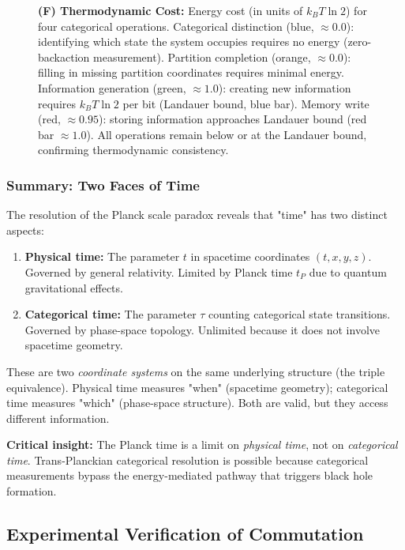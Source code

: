 \documentclass[twocolumn,10pt]{article}
\theoremstyle{remark}
\begin{document}
\begin{figure}[!htbp]
{\textbf{(F) Thermodynamic Cost:} Energy cost (in units of $k_B T \ln 2$) for four categorical operations. Categorical distinction (blue, $\approx 0.0$): identifying which state the system occupies requires no energy (zero-backaction measurement). Partition completion (orange, $\approx 0.0$): filling in missing partition coordinates requires minimal energy. Information generation (green, $\approx 1.0$): creating new information requires $k_B T \ln 2$ per bit (Landauer bound, blue bar). Memory write (red, $\approx 0.95$): storing information approaches Landauer bound (red bar $\approx 1.0$). All operations remain below or at the Landauer bound, confirming thermodynamic consistency.}
\label{fig:information_catalysis}
\end{figure}

\subsubsection{Summary: Two Faces of Time}

The resolution of the Planck scale paradox reveals that "time" has two distinct aspects:

\begin{enumerate}
    \item \textbf{Physical time:} The parameter $t$ in spacetime coordinates $(t, x, y, z)$. Governed by general relativity. Limited by Planck time $t_P$ due to quantum gravitational effects.
    
    \item \textbf{Categorical time:} The parameter $\tau$ counting categorical state transitions. Governed by phase-space topology. Unlimited because it does not involve spacetime geometry.
\end{enumerate}

These are two \textit{coordinate systems} on the same underlying structure (the triple equivalence). Physical time measures "when" (spacetime geometry); categorical time measures "which" (phase-space structure). Both are valid, but they access different information.

\textbf{Critical insight:} The Planck time is a limit on \textit{physical time}, not on \textit{categorical time}. Trans-Planckian categorical resolution is possible because categorical measurements bypass the energy-mediated pathway that triggers black hole formation.

\subsection{Experimental Verification of Commutation}
\end{document}

